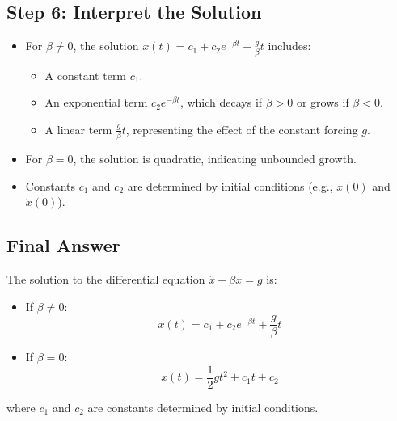 \documentclass[a4paper,12pt]{article}
\begin{document}
\subsection*{Step 6: Interpret the Solution}
\begin{itemize}
    \item For \(\beta \neq 0\), the solution \(x(t) = c_1 + c_2 e^{-\beta t} + \frac{g}{\beta} t\) includes:
    \begin{itemize}
        \item A constant term \(c_1\).
        \item An exponential term \(c_2 e^{-\beta t}\), which decays if \(\beta > 0\) or grows if \(\beta < 0\).
        \item A linear term \(\frac{g}{\beta} t\), representing the effect of the constant forcing \(g\).
    \end{itemize}
    \item For \(\beta = 0\), the solution is quadratic, indicating unbounded growth.
    \item Constants \(c_1\) and \(c_2\) are determined by initial conditions (e.g., \(x(0)\) and \(\dot{x}(0)\)).
\end{itemize}

\subsection*{Final Answer}
The solution to the differential equation \(\ddot{x} + \beta \dot{x} = g\) is:
\begin{itemize}
    \item If \(\beta \neq 0\):
    \begin{equation}
    x(t) = c_1 + c_2 e^{-\beta t} + \frac{g}{\beta} t
    \end{equation}
    \item If \(\beta = 0\):
    \begin{equation}
    x(t) = \frac{1}{2} g t^2 + c_1 t + c_2
    \end{equation}
\end{itemize}
where \(c_1\) and \(c_2\) are constants determined by initial conditions.

\end{document}
